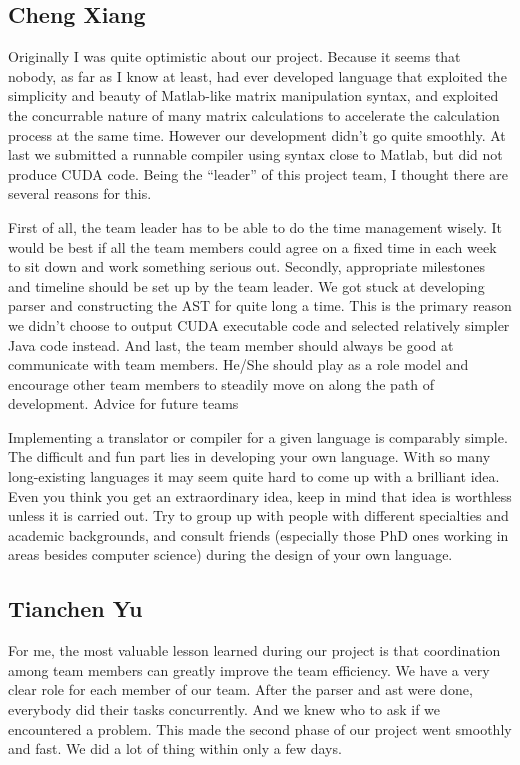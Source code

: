 \documentclass[12pt]{article} %
\begin{document}
\subsection{Cheng Xiang}
Originally I was quite optimistic about our project. Because it seems that nobody, as far as I know at least, had ever developed language that exploited the simplicity and beauty of Matlab-like matrix manipulation syntax, and exploited the concurrable nature of many matrix calculations to accelerate the calculation process at the same time. However our development didn’t go quite smoothly. At last we submitted a runnable compiler using syntax close to Matlab, but did not produce CUDA code. Being the “leader” of this project team, I thought there are several reasons for this.

First of all, the team leader has to be able to do the time management wisely. It would be best if all the team members could agree on a fixed time in each week to sit down and work something serious out. Secondly, appropriate milestones and timeline should be set up by the team leader. We got stuck at developing parser and constructing the AST for quite long a time. This is the primary reason we didn’t choose to output CUDA executable code and selected relatively simpler Java code instead. And last, the team member should always be good at communicate with team members. He/She should play as a role model and encourage other team members to steadily move on along the path of development.
Advice for future teams

Implementing a translator or compiler for a given language is comparably simple. The difficult and fun part lies in developing your own language. With so many long-existing languages it may seem quite hard to come up with a brilliant idea. Even you think you get an extraordinary idea, keep in mind that idea is worthless unless it is carried out. Try to group up with people with different specialties and academic backgrounds, and consult friends (especially those PhD ones working in areas besides computer science)  during the design of your own language.

\subsection{Tianchen Yu}
For me, the most valuable lesson learned during our project is that coordination among team members can greatly improve the team efficiency. We have a very clear role for each member of our team. After the parser and ast were done, everybody did their tasks concurrently. And we knew who to ask if we encountered a problem. This made the second phase of our project went smoothly and fast. We did a lot of thing within only a few days. 
\end{document}
